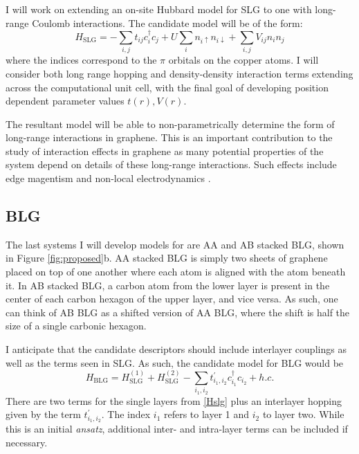 \documentclass[12pt]{article}
\begin{document}
I will work on extending an on-site Hubbard model for SLG \cite{Zheng2017, Wagner2015} to one with long-range Coulomb interactions.
The candidate model will be of the form:
\begin{equation}
H_\text{SLG} = -\sum_{i,j} t_{ij}c_i^\dagger c_j + U \sum_i n_{i\uparrow}n_{i\downarrow}  + \sum_{i,j} V_{ij} n_i n_j
\label{Hslg}
\end{equation}
where the indices correspond to the $\pi$ orbitals on the copper atoms.
I will consider both long range hopping and density-density interaction terms extending across the computational unit cell, with the final goal of developing position dependent parameter values $t(r), V(r)$.

The resultant model will be able to non-parametrically determine the form
of long-range interactions in graphene.
This is an important contribution to the study of interaction effects in graphene as many potential properties of the system depend on details of these long-range interactions.
Such effects include edge magentism \cite{PhysRevB.95.195420} and non-local electrodynamics \cite{PhysRevB.90.045137}.

\subsection{BLG}
The last systems I will develop models for are AA and AB stacked BLG, shown in Figure \ref{fig:proposed}b.
AA stacked BLG is simply two sheets of graphene placed on top of one another where each atom is aligned with the atom beneath it.
In AB stacked BLG, a carbon atom from the lower layer is present in the center of each carbon hexagon of the upper layer, and vice versa.
As such, one can think of AB BLG as a shifted version of AA BLG, where the shift is half the size of a single carbonic hexagon.

I anticipate that the candidate descriptors should include interlayer couplings as well as the terms seen in SLG.
As such, the candidate model for BLG would be
\begin{equation}
H_\text{BLG} = H_\text{SLG}^{(1)} + H_\text{SLG}^{(2)} - \sum_{i_1, i_2} t_{i_1, i_2}^\prime c_{i_1}^\dagger c_{i_2} + h.c.
\label{Hblg}
\end{equation}
There are two terms for the single layers from \eqref{Hslg} plus an interlayer hopping given by the term $t_{i_1, i_2}^\prime.$  
The index $i_1$ refers to layer 1 and $i_2$ to layer two.
While this is an initial \textit{ansatz}, additional inter- and intra-layer terms can be included if necessary.
\end{document}
